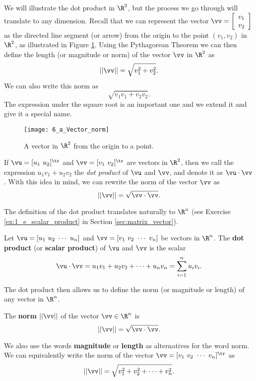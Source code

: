 We will illustrate the dot product in $\R^2$, but the process we go through will translate to any dimension. Recall that we can represent the vector $\vv = \left[ \begin{array}{c} v_1 \\ v_2 \end{array} \right]$ as the directed line segment (or arrow) from the origin to the point $(v_1, v_2)$ in $\R^2$, as illustrated in Figure \ref{F:6_a_Vector_norm}. Using the Pythagorean Theorem we can then define the length (or magnitude or norm) of the vector $\vv$ in $\R^2$ as
\[|| \vv || = \sqrt{v_1^2 + v_2^2}.\]
We can also write this norm as
\[\sqrt{v_1v_1 + v_2v_2}.\]
The expression under the square root is an important one and we extend it and give it a special name.
\begin{figure}[ht] \centering
\texttt{[image: 6\_a\_Vector\_norm]}
\caption{A vector in $\R^2$ from the origin to a point.}
\label{F:6_a_Vector_norm}
\end{figure}

If $\vu = [ u_1 \ u_2 ]^{\tr}$ and $\vv = [ v_1 \ v_2]^{\tr}$ are vectors in $\R^2$, then we call the expression $u_1v_1+u_2v_2$ the \emph{dot product} of $\vu$ and $\vv$, and denote it as $\vu \cdot \vv$. With this idea in mind, we can rewrite the norm of the vector $\vv$ as
\[|| \vv || = \sqrt{\vv \cdot \vv}.\]

The definition of the dot product translates naturally to $\R^n$ (see Exercise \ref{ex:1_e_scalar_product} in Section \ref{sec:matrix_vector}).

\begin{definition} \label{def:6_a_dot_product} Let $\vu = [u_1 \ u_2 \ \cdots \ u_n]$ and $\vv = [ v_1 \ v_2 \ \cdots \ v_n ]$ be vectors in $\R^n$. The \textbf{dot product} (or \textbf{scalar product}) of $\vu$ and $\vv$ is the scalar
\[\vu \cdot \vv = u_1v_1 + u_2v_2 + \cdots + u_nv_n = \displaystyle \sum_{i=1}^n u_iv_i.\]
\end{definition}

The dot product then allows us to define the norm (or magnitude or length) of any vector in $\R^n$.

\begin{definition} \label{def:6_a_length_Rn} The \textbf{norm} $||\vv||$ of the vector $\vv \in \R^n$ is 
\[||\vv|| = \sqrt{\vv \cdot \vv}.\]
\end{definition}

We also use the words \textbf{magnitude} or \textbf{length} as alternatives for the word norm. We can equivalently write the norm of the vector $\vv = [ v_1 \ v_2 \ \cdots \ v_n ]^{\tr}$ as 
\[||\vv|| = \sqrt{v_1^2 + v_2^2 + \cdots + v_n^2}.\]

